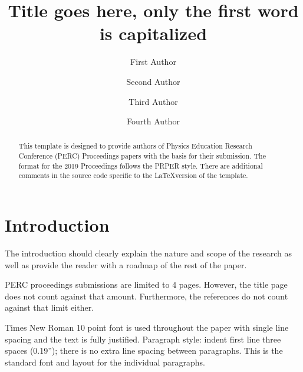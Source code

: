 \documentclass[english,aps,prstper,reprint,showpacs,titlepage,longbibliography]{revtex4-2}
\begin{document}
\begin{titlepage}

  \title{Title goes here, only the first word is capitalized}

  \author{First Author}
  \author{Second Author}
  \author{Third Author}
  \author{Fourth Author}


  \begin{abstract}
    This template is designed to provide authors of Physics Education Research Conference
    (PERC) Proceedings papers with the basis for their submission.  The format for the 2019
    Proceedings follows the PRPER style.  There are additional comments in the source code
    specific to the \LaTeX version of the template. \clearpage
  \end{abstract}

  \maketitle
\end{titlepage}


\section{Introduction}
The introduction should clearly explain the nature and scope of the research as well as provide
the reader with a roadmap of the rest of the paper.

PERC proceedings submissions are limited to 4 pages.  However, the title page does not count
against that amount.  Furthermore, the references do not count against that limit either.
	
Times New Roman 10 point font is used throughout the paper with single line spacing and the
text is fully justified.  Paragraph style: indent first line three spaces (0.19''); there is no
extra line spacing between paragraphs.  This is the standard font and layout for the individual
paragraphs. %
\end{document}

